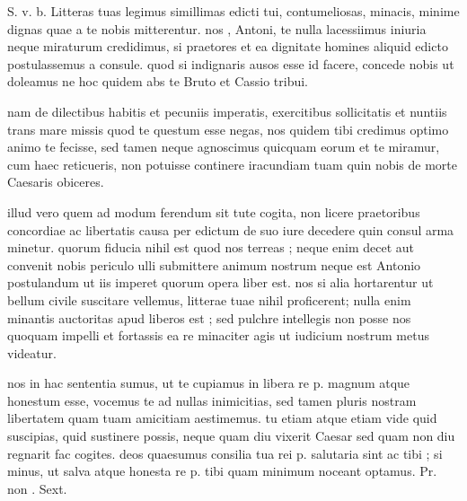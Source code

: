 


 S. v. b. Litteras tuas legimus simillimas edicti tui, contumeliosas, minacis, minime dignas quae a te nobis mitterentur. nos , Antoni, te nulla lacessiimus iniuria neque miraturum credidimus, si praetores et ea dignitate homines aliquid edicto postulassemus a consule. quod si indignaris ausos esse id facere, concede nobis ut doleamus ne hoc quidem abs te Bruto et Cassio tribui.

 nam de dilectibus habitis et pecuniis imperatis, exercitibus sollicitatis et nuntiis trans mare missis quod te questum esse negas, nos quidem tibi credimus optimo animo te fecisse, sed tamen neque agnoscimus quicquam eorum et te miramur, cum haec reticueris, non potuisse continere iracundiam tuam quin nobis de morte Caesaris obiceres.

 illud vero quem ad modum ferendum sit tute cogita, non licere praetoribus concordiae ac libertatis causa per edictum de suo iure decedere quin consul arma minetur. quorum fiducia nihil est quod nos terreas ; neque enim decet aut convenit nobis periculo ulli submittere animum nostrum neque est Antonio postulandum ut iis imperet quorum opera liber est. nos si alia hortarentur ut bellum civile suscitare vellemus, litterae tuae nihil proficerent; nulla enim minantis auctoritas apud liberos est ; sed pulchre intellegis non posse nos quoquam impelli et fortassis ea re minaciter agis ut iudicium nostrum metus videatur.

 nos in hac sententia sumus, ut te cupiamus in libera re p. magnum atque honestum esse, vocemus te ad nullas inimicitias, sed tamen pluris nostram libertatem quam tuam amicitiam aestimemus. tu etiam atque etiam vide quid suscipias, quid sustinere possis, neque quam diu vixerit Caesar sed quam non diu regnarit fac cogites. deos quaesumus consilia tua rei p. salutaria sint ac tibi ; si minus, ut salva atque honesta re p. tibi quam minimum noceant optamus. Pr. non . Sext.
